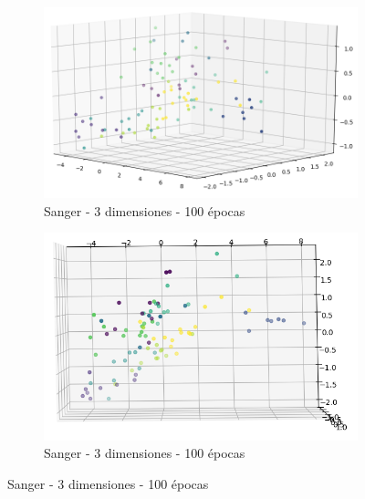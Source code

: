 \begin{figure}[!htbp]
\centering
\begin{subfigure}{.5\textwidth}
  \centering
  \includegraphics[width=1\linewidth, scale=1]{../img/ej1/sanger/sanger_3salida_100ep_validation.png}
  \caption{Sanger - 3 dimensiones - 100 épocas}
  \label{fig:sub1}
\end{subfigure}%
\begin{subfigure}{.5\textwidth}
  \centering
  \includegraphics[width=1\linewidth, scale=1]{../img/ej1/sanger/sanger_3salida_100ep_validation_3.png}
  \caption{Sanger - 3 dimensiones - 100 épocas}
  \label{fig:sub2}
\end{subfigure}
\end{figure}

